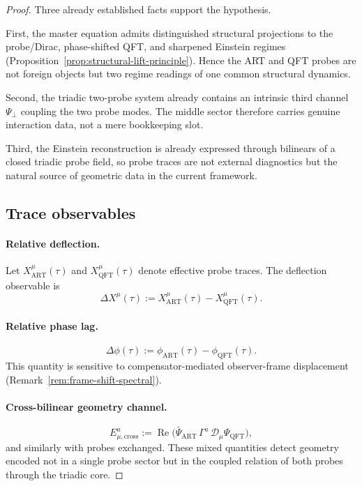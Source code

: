 \begin{proof}
Three already established facts support the hypothesis.

First, the master equation admits distinguished structural projections to
the probe/Dirac, phase-shifted QFT, and sharpened Einstein regimes
(Proposition~\ref{prop:structural-lift-principle}). Hence the ART and QFT
probes are not foreign objects but two regime readings of one common
structural dynamics.

Second, the triadic two-probe system already contains an intrinsic third
channel $\Psi_\perp$ coupling the two probe modes. The middle sector
therefore carries genuine interaction data, not a mere bookkeeping slot.

Third, the Einstein reconstruction is already expressed through bilinears
of a closed triadic probe field, so probe traces are not external
diagnostics but the natural source of geometric data in the current
framework.

\subsection*{Trace observables}

\paragraph*{Relative deflection.}
Let $X^\mu_{\mathrm{ART}}(\tau)$ and $X^\mu_{\mathrm{QFT}}(\tau)$
denote effective probe traces. The deflection observable is
\[
  \Delta X^\mu(\tau)
  :=
  X^\mu_{\mathrm{ART}}(\tau) - X^\mu_{\mathrm{QFT}}(\tau).
\]

\paragraph*{Relative phase lag.}
\[
  \Delta\phi(\tau)
  :=
  \phi_{\mathrm{ART}}(\tau) - \phi_{\mathrm{QFT}}(\tau).
\]
This quantity is sensitive to compensator-mediated observer-frame
displacement (Remark~\ref{rem:frame-shift-spectral}).

\paragraph*{Cross-bilinear geometry channel.}
\[
  E^{a}_{\mu,\mathrm{cross}}
  :=
  \operatorname{Re}\bigl(
    \bar\Psi_{\mathrm{ART}}
    \,\Gamma^a\,
    \mathcal{D}_\mu
    \Psi_{\mathrm{QFT}}
  \bigr),
\]
and similarly with probes exchanged. These mixed quantities detect
geometry encoded not in a single probe sector but in the coupled
relation of both probes through the triadic core.


\end{proof}
